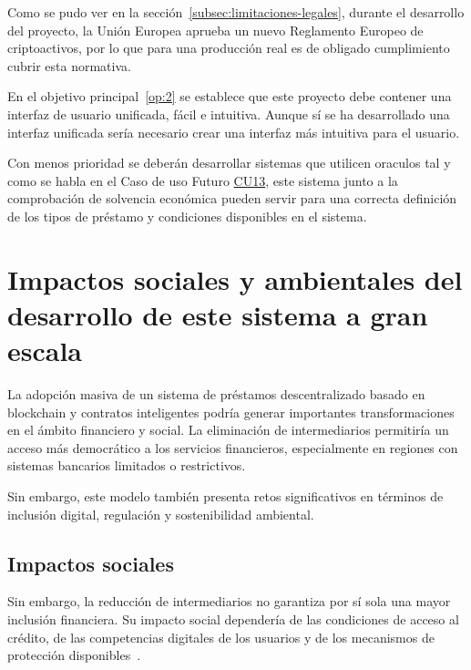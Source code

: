 Como se pudo ver en la sección~\ref{subsec:limitaciones-legales}, durante
el desarrollo del proyecto, la Unión Europea aprueba un nuevo Reglamento Europeo de
criptoactivos, por lo que para una producción real es de obligado cumplimiento 
cubrir esta normativa.

En el objetivo principal~\ref{op:2} se establece que este proyecto debe contener una interfaz de usuario
unificada, fácil e intuitiva. Aunque sí se ha desarrollado una interfaz unificada
sería necesario crear una interfaz más intuitiva para el usuario.

Con menos prioridad se deberán desarrollar sistemas que utilicen \glspl{oraculo}
tal y como se habla en el Caso de uso Futuro \hyperlink{cu:euribor}{CU13}, este sistema junto a la comprobación
de solvencia económica pueden servir para una correcta definición de  los tipos de 
préstamo y condiciones disponibles en el sistema.





\section{Impactos sociales y ambientales del desarrollo de este sistema a gran escala}

La adopción masiva de un sistema de préstamos descentralizado basado en blockchain y 
contratos inteligentes podría generar importantes transformaciones en el ámbito financiero y social.
La eliminación de intermediarios permitiría un acceso más democrático a los servicios financieros,
especialmente en regiones con sistemas bancarios limitados o restrictivos.

Sin embargo, este modelo también presenta retos significativos en términos de inclusión digital,
     regulación y sostenibilidad ambiental.

\subsection{Impactos sociales}
Sin embargo,
la reducción de intermediarios no garantiza por sí sola una mayor
inclusión financiera. Su impacto social dependería de las condiciones
de acceso al crédito, de las competencias digitales de los usuarios
y de los mecanismos de protección disponibles~\cite{oecd2024defi}.

